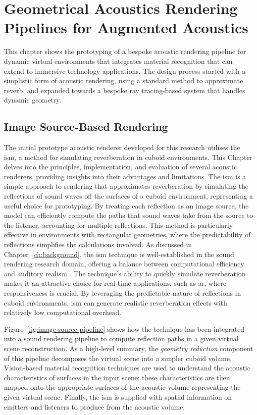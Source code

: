 \chapter{Geometrical Acoustics Rendering Pipelines for Augmented Acoustics}\label{ch:acoustic-rendering} %

This chapter shows the prototyping of a bespoke acoustic rendering pipeline for dynamic virtual environments that integrates material recognition that can extend to immersive technology applications. The design process started with a simplistic form of acoustic rendering, using a standard method to approximate reverb, and expanded towards a bespoke ray tracing-based system that handles dynamic geometry.

\section{Image Source-Based Rendering}
The initial prototype acoustic renderer developed for this research utilises the \acrfull{ism}, a method for simulating reverberation in cuboid environments. This Chapter delves into the principles, implementation, and evaluation of several acoustic renderers, providing insights into their advantages and limitations. The \acrshort{ism} is a simple approach to rendering that approximates reverberation by simulating the reflections of sound waves off the surfaces of a cuboid environment, representing a useful choice for prototyping. By treating each reflection as an image source, the model can efficiently compute the paths that sound waves take from the source to the listener, accounting for multiple reflections. This method is particularly effective in environments with rectangular geometries, where the predictability of reflections simplifies the calculations involved. As discussed in Chapter~\ref{ch:background}, the \acrshort{ism} technique is well-established in the sound rendering research domain, offering a balance between computational efficiency and auditory realism  \citep{savioja1999creating, allen1979image}. The technique's ability to quickly simulate reverberation makes it an attractive choice for real-time applications, such as \acrshort{ar}, where responsiveness is crucial. By leveraging the predictable nature of reflections in cuboid environments, \acrshort{ism} can generate realistic reverberation effects with relatively low computational overhead.\par
Figure~\ref{fig:image-source-pipeline} shows how the technique has been integrated into a sound rendering pipeline to compute reflection paths in a given virtual scene reconstruction. As a high-level summary, the \emph{geometry reduction} component of this pipeline decomposes the virtual scene into a simpler cuboid volume. Vision-based material recognition techniques are used to understand the acoustic characteristics of surfaces in the input scene; these characteristics are then mapped onto the appropriate surfaces of the acoustic volume representing the given virtual scene. Finally, the \acrshort{ism} is supplied with spatial information on emitters and listeners to produce  from the acoustic volume.\par

